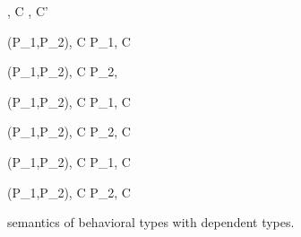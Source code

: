 \begin{figure}
\begin{minipage}{\textwidth}



{ \langle \Endconst, C \rangle \rightarrow {}, C' \rangle }


\begin{minipage}{0.5\textwidth}
{ \langle \Sirx (P_1,P_2), C \rangle \xlongrightarrow{\snull} \langle P_1, C \rangle }
\end{minipage}
\begin{minipage}{0.5\textwidth}
\infrule[Tr-NotConst2]
{ \scon\Sirx \notin  }
{ \langle \Sirx (P_1,P_2), C \rangle \xlongrightarrow{\snnull} \langle P_2,  \rangle }
\end{minipage}
\vspace{2mm}

\begin{minipage}{0.5\textwidth}
{ \langle \Sirx (P_1,P_2), C \rangle \rightarrow \langle P_1, C \rangle }
\end{minipage}
\begin{minipage}{0.5\textwidth}
{ \langle \Sirx (P_1,P_2), C \rangle \rightarrow \langle P_2, C \rangle }
\end{minipage}


{ \langle \Sirx (P_1,P_2), C \rangle \xlongrightarrow{\snull} \langle P_1, C\cup{\snull} \rangle }

{ \langle \Sirx (P_1,P_2), C \rangle \xlongrightarrow{\snnull} \langle P_2, C\cup{\snnull} \rangle }

 



\end{minipage}
\caption{semantics of behavioral types with dependent types.}
\label{fig:bdRules}
\end{figure}

